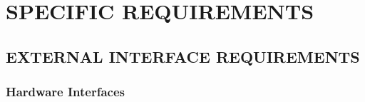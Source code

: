 \documentclass[letterpaper, 10pt, draftclsnofoot, onecolumn]{IEEEtran}
\begin{document}

\clearpage\section[SPECIFIC
REQUIREMENTS]{\rmfamily\bfseries\color{black}
SPECIFIC REQUIREMENTS}

\subsection[EXTERNAL INTERFACE
REQUIREMENTS]{\rmfamily\bfseries\color{black}
EXTERNAL INTERFACE REQUIREMENTS}



\subsubsection[Hardware
Interfaces]{\rmfamily\bfseries\color{black}
Hardware Interfaces}
\end{document}
